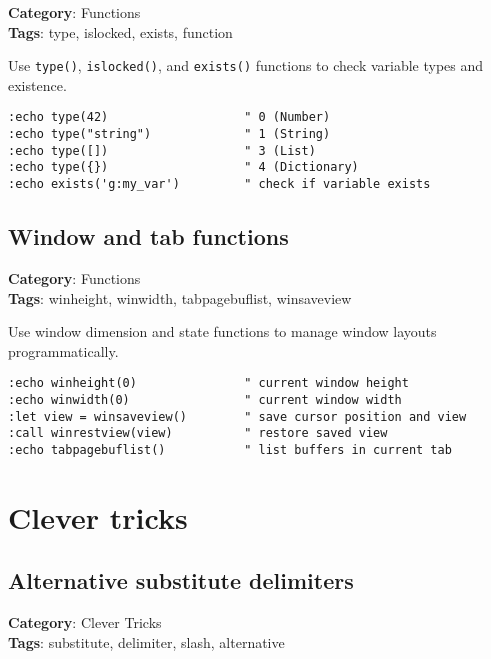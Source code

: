\textbf{Category}: Functions\\ \textbf{Tags}: type, islocked, exists, function
\vspace{0.5cm}

Use {\footnotesize \Verb§type()§}, {\footnotesize \Verb§islocked()§}, and {\footnotesize \Verb§exists()§} functions to check variable types and existence.

\begin{Exa*}{}
\begin{Verbatim}[fontsize=\footnotesize, breaklines, breakanywhere]
:echo type(42)                   " 0 (Number)
:echo type("string")             " 1 (String)  
:echo type([])                   " 3 (List)
:echo type({})                   " 4 (Dictionary)
:echo exists('g:my_var')         " check if variable exists
\end{Verbatim}
\end{Exa*}

\section{Window and tab functions}

\textbf{Category}: Functions\\ \textbf{Tags}: winheight, winwidth, tabpagebuflist, winsaveview
\vspace{0.5cm}

Use window dimension and state functions to manage window layouts programmatically.

\begin{Exa*}{}
\begin{Verbatim}[fontsize=\footnotesize, breaklines, breakanywhere]
:echo winheight(0)               " current window height
:echo winwidth(0)                " current window width  
:let view = winsaveview()        " save cursor position and view
:call winrestview(view)          " restore saved view
:echo tabpagebuflist()           " list buffers in current tab
\end{Verbatim}
\end{Exa*}

\chapter{Clever tricks}
\section{Alternative substitute delimiters}

\textbf{Category}: Clever Tricks\\ \textbf{Tags}: substitute, delimiter, slash, alternative
\vspace{0.5cm}

